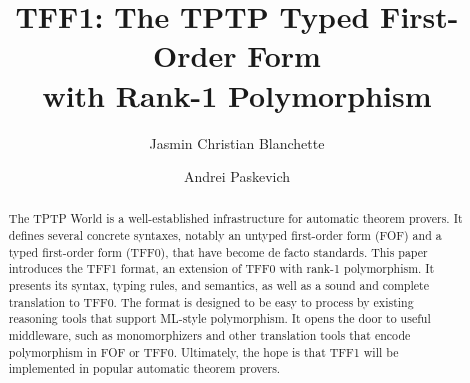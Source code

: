 \documentclass[a4paper]{llncs}
\begin{document}
\title{
TFF1: The TPTP Typed First-Order Form \\ with Rank-1
Polymorphism}

\author{
Jasmin Christian Blanchette \and
Andrei Paskevich
}


\maketitle

\setcounter{footnote}{0}

\begin{abstract}
The TPTP World is a well-established infrastructure for automatic theorem
provers. It defines several concrete syntaxes,
notably an untyped first-order form (FOF) and a typed first-order form (TFF0),
that have become de facto standards.
This paper introduces the TFF1 format, an extension of TFF0 with
rank-1 polymorphism. It presents its syntax, typing rules, and semantics, as
well as a sound and complete translation to TFF0. The format is designed to be
easy to process by existing reasoning tools that support ML-style polymorphism.
It opens the door to useful middleware, such as monomorphizers and other
translation tools that encode polymorphism in FOF or TFF0. Ultimately, the hope
is that TFF1 will be implemented in popular automatic theorem provers.
\end{abstract}









\end{document}
